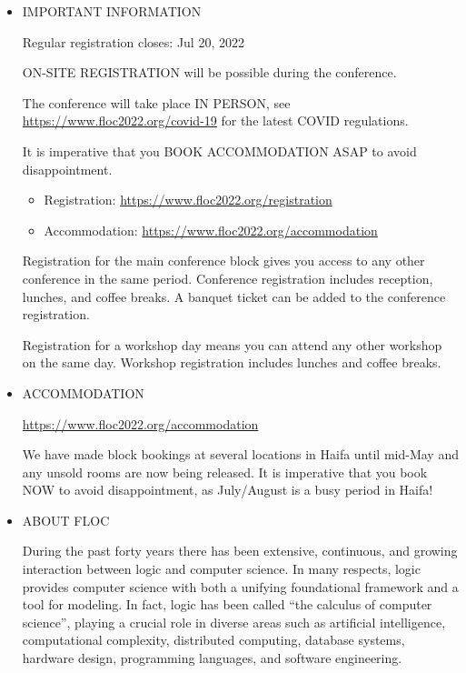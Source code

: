 \documentclass[prodmode,acmtecs]{acmsmall} %
\begin{document}
\begin{itemize}\item  IMPORTANT INFORMATION 
 
Regular registration closes: Jul 20, 2022 
 
  ON-SITE REGISTRATION will be possible during the conference. 
 
  The conference will take place IN PERSON, see \href{https://www.floc2022.org/covid-19}{https://www.floc2022.org/covid-19} for the latest COVID regulations. 
 
  It is imperative that you BOOK ACCOMMODATION ASAP to avoid disappointment. 
 
\begin{itemize}\item  Registration: \href{https://www.floc2022.org/registration}{https://www.floc2022.org/registration}
\item  Accommodation: \href{https://www.floc2022.org/accommodation}{https://www.floc2022.org/accommodation}
\end{itemize} 
  Registration for the main conference block gives you access to any other conference in the same period. Conference registration includes reception, lunches, and coffee breaks. A banquet ticket can be added to the conference registration. 
 
  Registration for a workshop day means you can attend any other workshop on the same day. Workshop registration includes lunches and coffee breaks. 
 
\item  ACCOMMODATION 
 
  \href{https://www.floc2022.org/accommodation}{https://www.floc2022.org/accommodation} 
 
  We have made block bookings at several locations in Haifa until mid-May and any unsold rooms are now being released. It is imperative that you book NOW to avoid disappointment, as July/August is a busy period in Haifa! 
 
\item  ABOUT FLOC 
 
  During the past forty years there has been extensive, continuous, and growing interaction between logic and computer science. In many respects, logic provides computer science with both a unifying foundational framework and a tool for modeling. In fact, logic has been called “the calculus of computer science”, playing a crucial role in diverse areas such as artificial intelligence, computational complexity, distributed computing, database systems, hardware design, programming languages, and software engineering. 
 

\end{itemize}
\end{document}
